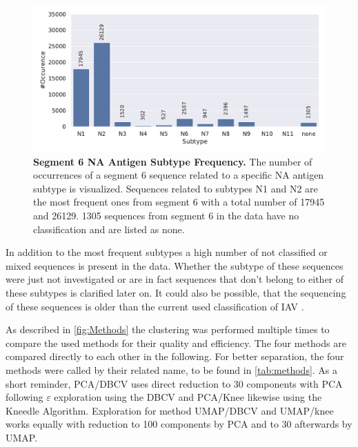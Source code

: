 \begin{figure}[!hbt]
    \centering
    \includegraphics[width=\textwidth]{PCA/Data_Overview_Segment_6_N.pdf}
    \caption[Segment 6 \Acrlong{NA} Antigen Subtype Frequency]{\textbf{Segment 6 \Acrlong{NA} Antigen Subtype Frequency.} The number of occurrences of a segment 6 sequence related to a specific \gls{NA} antigen subtype is visualized. Sequences related to subtypes N1 and N2 are the most frequent ones from segment 6 with a total number of 17945 and 26129. 1305 sequences from segment 6 in the data have no classification and are listed as \glqq none\grqq{}.}
    \label{fig:Frequency_6}
\end{figure}

In addition to the most frequent subtypes a high number of not classified or \glqq mixed\grqq{} sequences is present in the data. Whether the subtype of these sequences were just not investigated or are in fact sequences that don't belong to either of these subtypes is clarified later on. It could also be possible, that the sequencing of these sequences is older than the current used classification of \gls{IAV} \autocite{noauthor_revision_1980}. 

As described in \autoref{fig:Methods} the clustering was performed multiple times to compare the used methods for their quality and efficiency. The four methods are compared directly to each other in the following. For better separation, the four methods were called by their related name, to be found in \autoref{tab:methods}. As a short reminder, \acrshort{PCA}/\acrshort{DBCV} uses direct reduction to 30 components with \gls{PCA} following $\varepsilon$ exploration using the \gls{DBCV} and \acrshort{PCA}/Knee likewise using the Kneedle Algorithm. Exploration for method \acrshort{UMAP}/\acrshort{DBCV} and \acrshort{UMAP}/knee works equally with reduction to 100 components by \gls{PCA} and to 30 afterwards by \gls{UMAP}.   

